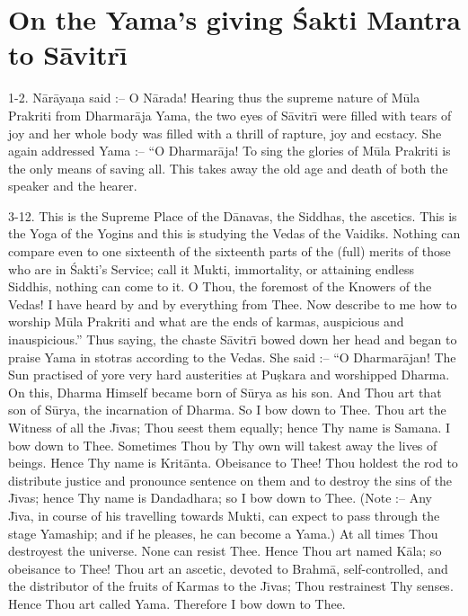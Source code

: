 \chapter{On the Yama's giving \'Sakti Mantra to S\=avitr\={\i}}

1-2. N\=ar\=aya\d{n}a said :-- O N\=arada! Hearing thus the supreme nature of M\=ula Prakriti from Dharmar\=aja Yama, the two eyes of S\=avitr\={\i} were filled with tears of joy and her whole body was filled with a thrill of rapture, joy and ecstacy. She again addressed Yama :-- ``O Dharmar\=aja! To sing the glories of M\=ula Prakriti is the only means of saving all. This takes away the old age and death of both the speaker and the hearer.

3-12. This is the Supreme Place of the D\=anavas, the Siddhas, the ascetics. This is the Yoga of the Yogins and this is studying the Vedas of the Vaidiks. Nothing can compare even to one sixteenth of the sixteenth parts of the (full) merits of those who are in \'Sakti's Service; call it Mukti, immortality, or attaining endless Siddhis, nothing can come to it. O Thou, the foremost of the Knowers of the Vedas! I have heard by and by everything from Thee. Now describe to me how to worship M\=ula Prakriti and what are the ends of karmas, auspicious and inauspicious.'' Thus saying, the chaste S\=avitr\={\i} bowed down her head and began to praise Yama in stotras according to the Vedas. She said :-- ``O Dharmar\=ajan! The Sun practised of yore very hard austerities at Pu\d{s}kara and worshipped Dharma. On this, Dharma Himself became born of S\=urya as his son. And Thou art that son of S\=urya, the incarnation of Dharma. So I bow down to Thee. Thou art the Witness of all the J\={\i}vas; Thou seest them equally; hence Thy name is Samana. I bow down to Thee. Sometimes Thou by Thy own will takest away the lives of beings. Hence Thy name is Krit\=anta. Obeisance to Thee! Thou holdest the rod to distribute justice and pronounce sentence on them and to destroy the sins of the J\={\i}vas; hence Thy name is Dandadhara; so I bow down to Thee. (Note :-- Any J\={\i}va, in course of his travelling towards Mukti, can expect to pass through the stage Yamaship; and if he pleases, he can become a Yama.) At all times Thou destroyest the universe. None can resist Thee. Hence Thou art named K\=ala; so obeisance to Thee! Thou art an ascetic, devoted to Brahm\=a, self-controlled, and the distributor of the fruits of Karmas to the J\={\i}vas; Thou restrainest Thy senses. Hence Thou art called Yama. Therefore I bow down to Thee.


